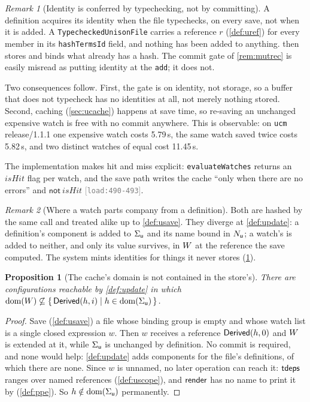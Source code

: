 \documentclass[11pt]{article}
\theoremstyle{definition}
\theoremstyle{plain}
\newtheorem{proposition}{Proposition}[section]
\theoremstyle{remark}
\newtheorem{remark}{Remark}[section]
\newcommand{\src}[1]{{\footnotesize\textcolor{gray}{[\texttt{#1}]}}}
\begin{document}
\begin{remark}[Identity is conferred by typechecking, not by committing]\label{rem:saveident}
A definition acquires its identity when the file typechecks, on every save, not when it is added. A
\texttt{TypecheckedUnisonFile} carries a reference $r$ (\cref{def:uref}) for every member in its
\texttt{hashTermsId} field, and nothing has been added to anything.  then stores and
binds what already has a hash. The commit gate of \cref{rem:mutrec} is easily misread as putting
identity at the \texttt{add}; it does not.

Two consequences follow. First, the gate is on identity, not storage, so a buffer that does not
typecheck has no identities at all, not merely nothing stored. Second, caching (\cref{sec:ucache})
happens at save time, so re-saving an unchanged expensive watch is free with no commit anywhere. This
is observable: on \texttt{ucm} release/1.1.1 one expensive watch costs 5.79\,s, the same watch saved
twice costs 5.82\,s, and two distinct watches of equal cost 11.45\,s.

The implementation makes hit and miss explicit: \texttt{evaluateWatches} returns an $\mathit{isHit}$
flag per watch, and the save path writes the cache ``only when there are no errors'' and
$\mathsf{not}\ \mathit{isHit}$ \src{load:490-493}.
\end{remark}

\begin{remark}[Where a watch parts company from a definition]\label{rem:watchsplit}
Both are hashed by the same call and treated alike up to \cref{def:usave}. They diverge at
\cref{def:update}: a definition's component is added to $\Sigma_{\mathsf{u}}$ and its name bound in $N_{\mathsf{u}}$; a
watch's is added to neither, and only its value survives, in $W$ at the reference the save
computed. The system mints identities for things it never stores (\cref{prop:watchdom}).
\end{remark}

\begin{proposition}[The cache's domain is not contained in the store's]\label{prop:watchdom}
There are configurations reachable by \cref{def:update} in which
$\operatorname{dom}(W) \not\subseteq \{\,\mathsf{Derived}(h,i) \mid h \in \operatorname{dom}(\Sigma_{\mathsf{u}})\,\}$.
\end{proposition}
\begin{proof}
Save (\cref{def:usave}) a file whose binding group is empty and whose watch list is a single closed
expression $w$. Then $w$ receives a reference $\mathsf{Derived}(h,0)$ and $W$ is extended at it, while
$\Sigma_{\mathsf{u}}$ is unchanged by definition. No commit is required, and none would help: \cref{def:update}
adds components for the file's definitions, of which there are none. Since $w$ is unnamed, no later
operation can reach it: $\mathsf{tdeps}$ ranges over named references (\cref{def:uscope}), and $\mathsf{render}$ has
no name to print it by (\cref{def:ppe}). So $h \notin \operatorname{dom}(\Sigma_{\mathsf{u}})$ permanently.
\end{proof}
\end{document}
